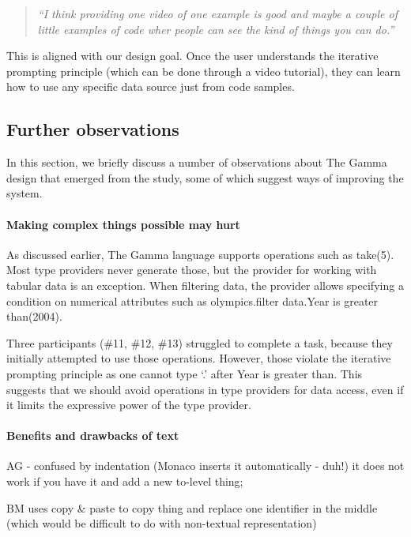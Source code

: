 \documentclass{sigchi}
\newcommand{\ikvd}[1]{{\fontfamily{zi4}\selectfont\small #1}}
\begin{document}
\begin{quote}
  \emph{``I think providing one video of one example is good and maybe a couple of little examples
  of code wher people can see the kind of things you can do.''}
\end{quote}

This is aligned with our design goal. Once the user understands the iterative prompting principle
(which can be done through a video tutorial), they can learn how to use any specific data source
just from code samples.

\subsection{Further observations}
In this section, we briefly discuss a number of observations about The Gamma design that
emerged from the study, some of which suggest ways of improving the system.

\paragraph{Making complex things possible may hurt}
As discussed earlier, The Gamma language supports operations such as \ikvd{take(5)}. Most type
providers never generate those, but the provider for working with tabular data is an exception.
When filtering data, the provider allows specifying a condition on numerical attributes such as
\ikvd{olympics.\textquotesingle filter data\textquotesingle.\textquotesingle Year is greater than\textquotesingle(2004)}.

Three participants (\#11, \#12, \#13) struggled to complete a task, because they
initially attempted to use those operations. However, those violate the iterative prompting
principle as one cannot type `.' after \ikvd{\textquotesingle Year is greater than\textquotesingle}.
This suggests that we should avoid operations in type providers for data access, even if it
limits the expressive power of the type provider.

\paragraph{Benefits and drawbacks of text}

AG - confused by indentation (Monaco inserts it automatically - duh!)
it does not work if you have it and add a new to-level thing;

BM uses copy & paste to copy thing and replace one identifier in the middle
(which would be difficult to do with non-textual representation)
\end{document}
